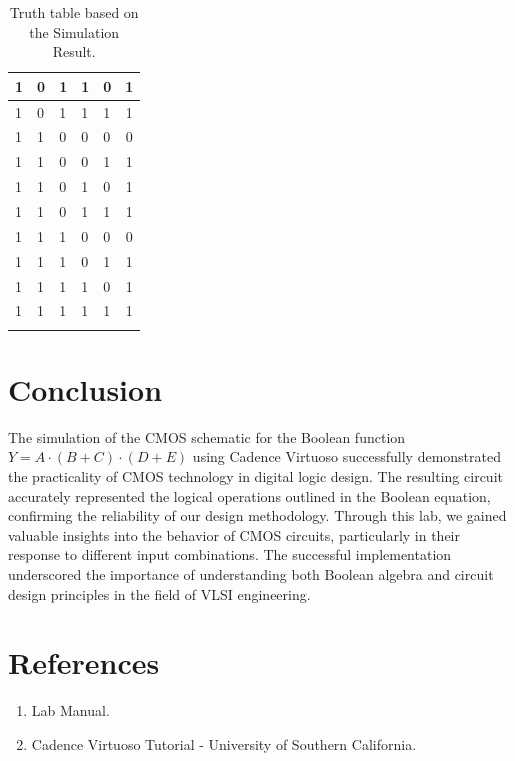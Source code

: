 \documentclass[11pt]{article}
\begin{document}
\begin{longtable}[!h]{|l|l|l|l|l|c|}
    1   & 0   & 1   & 1   & 0   & 1                         \\ \hline
    1   & 0   & 1   & 1   & 1   & 1                         \\ \hline
    1   & 1   & 0   & 0   & 0   & 0                         \\ \hline
    1   & 1   & 0   & 0   & 1   & 1                         \\ \hline
    1   & 1   & 0   & 1   & 0   & 1                         \\ 
    1   & 1   & 0   & 1   & 1   & 1                         \\ \hline
    1   & 1   & 1   & 0   & 0   & 0                         \\ \hline
    1   & 1   & 1   & 0   & 1   & 1                         \\ \hline
    1   & 1   & 1   & 1   & 0   & 1                         \\ \hline
    1   & 1   & 1   & 1   & 1   & 1                         \\ \hline
    \caption{Truth table based on the Simulation Result.}
\end{longtable}
\section{Conclusion}
The simulation of the CMOS schematic for the Boolean function $Y=A\cdot(B+C)\cdot(D+E)$ using Cadence Virtuoso successfully demonstrated the practicality of CMOS technology in digital logic design. The resulting circuit accurately represented the logical operations outlined in the Boolean equation, confirming the reliability of our design methodology. Through this lab, we gained valuable insights into the behavior of CMOS circuits, particularly in their response to different input combinations. The successful implementation underscored the importance of understanding both Boolean algebra and circuit design principles in the field of VLSI engineering.
\section{References}
\begin{enumerate}
    \item Lab Manual.
    \item Cadence Virtuoso Tutorial - University of Southern California.
\end{enumerate}
\end{document}
